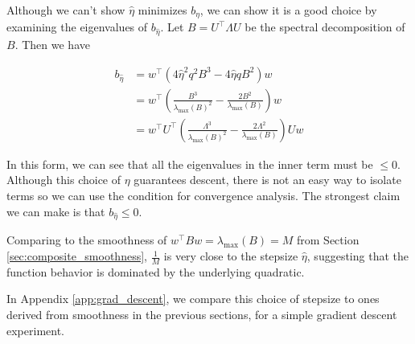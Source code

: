\documentclass[11pt]{article}
\begin{document}
Although we can't show $\hat{\eta}$ minimizes $b_{\eta}$, we can show it is a good choice by examining the eigenvalues of $b_{\hat{\eta}}$. Let $B = U^{\top} \Lambda U$ be the spectral decomposition of $B$. Then we have

\begin{align*}
    b_{\hat{\eta}} &= w^{\top} ( 4 \hat{\eta}^2 q^2 B^3 - 4 \hat{\eta} q B^2)w \\
    &= w^{\top} \left( \frac{B^3}{\lambda_{\max}(B)^2} - \frac{2 B^2}{\lambda_{\max}(B)} \right) w \\
    &= w^{\top} U^{\top} \left( \frac{\Lambda^3}{\lambda_{\max}(B)^2} - \frac{2 \Lambda^2}{\lambda_{\max}(B)} \right) Uw
\end{align*}

In this form, we can see that all the eigenvalues in the inner term must be $\leq 0$. Although this choice of $\eta$ guarantees descent, there is not an easy way to isolate terms so we can use the condition for convergence analysis. The strongest claim we can make is that $b_{\hat{\eta}} \leq 0$.

Comparing to the smoothness of $w^{\top}Bw = \lambda_{\max}(B) = M$ from Section \ref{sec:composite_smoothness}, $\frac{1}{M}$ is very close to the stepsize $\hat{\eta}$, suggesting that the function behavior is dominated by the underlying quadratic.

In Appendix \ref{app:grad_descent}, we compare this choice of stepsize to ones derived from smoothness in the previous sections, for a simple gradient descent experiment.



\end{document}
